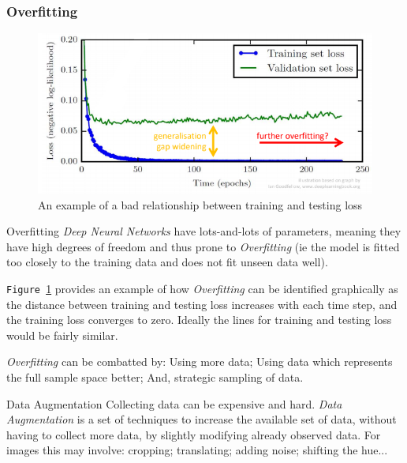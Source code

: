 \documentclass[11pt,a4paper]{article}
\begin{document}
\subsubsection{Overfitting} \label{sec_DNNOverfitting}

  \begin{figure}[H]
    \centering
    \includegraphics[width=.7\textwidth]{overfitting.PNG}
    \caption{An example of a bad relationship between training and testing loss}
    \label{fig_Overfitting}
  \end{figure}

  \begin{proposition}{Overfitting}
    \textit{Deep Neural Networks} have lots-and-lots of parameters, meaning they have high degrees of freedom and thus prone to \textit{Overfitting} (ie the model is fitted too closely to the training data and does not fit unseen data well).
    \par \texttt{Figure \ref{fig_Overfitting}} provides an example of how \textit{Overfitting} can be identified graphically as the distance between training and testing loss increases with each time step, and the training loss converges to zero. Ideally the lines for training and testing loss would be fairly similar.
    \par \textit{Overfitting} can be combatted by: Using more data; Using data which represents the full sample space better; And, strategic sampling of data.
  \end{proposition}

  \begin{definition}{Data Augmentation}
    Collecting data can be expensive and hard. \textit{Data Augmentation} is a set of techniques to increase the available set of data, without having to collect more data, by slightly modifying already observed data. For images this may involve: cropping; translating; adding noise; shifting the hue...
  \end{definition}
\end{document}
